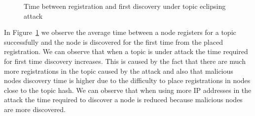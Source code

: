 \begin{figure}[!h]
\centering
{} 
\hspace{-0.16cm}
 \caption{Time between registration and first discovery under topic eclipsing attack} 
\label{fig:discoverytime_eclipse}
\vspace{-0.15in}
\end{figure}   

In Figure~\ref{fig:discoverytime_eclipse} we observe the average time between a node registers for a topic successfully and the node is discovered for the first time from the placed registration.
We can observe that when a topic is under attack the time required for first time discovery increases. 
This is caused by the fact that there are much more registrations in the topic caused by the attack and also that malicious nodes discovery time is higher due to the difficulty to place registrations in nodes close to the topic hash.  
We can observe that when using more IP addresses in the attack the time required to discover a node is reduced because malicious nodes are more discovered.

